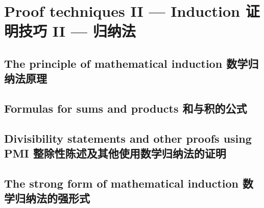 \chapter{Proof techniques II --- Induction 证明技巧 II --- 归纳法}


\section{The principle of mathematical induction 数学归纳法原理}






 
\newpage

\section{Formulas for sums and products 和与积的公式}





\newpage

\section[Other proofs using PMI]{Divisibility statements and other proofs using PMI 整除性陈述及其他使用数学归纳法的证明}





\newpage
 
\section{The strong form of mathematical induction 数学归纳法的强形式}





